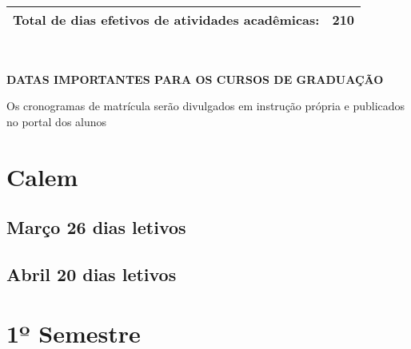 \documentclass[thesis]{hmcposter}
\begin{document}
\begin{poster}
\begin{center}
\begin{table}
{\begin{tabular}{|c|c|c|c|c|c|c|}
\multicolumn{6}{|c|}{\small \textbf{Total de dias efetivos de atividades acadêmicas:}}              & 210            \\ \hline
\end{tabular}
}
\end{table}
\null
\end{center}
\vfill
\null
\columnbreak
~
\vfill
\begin{center}
\large \textbf{DATAS IMPORTANTES PARA OS CURSOS DE GRADUAÇÃO}
\newline
\null
\newline
\begin{table}
\centering
{}
\end{table}
\newline
\null
\newline
Os cronogramas de matrícula serão divulgados em instrução própria e publicados no portal dos alunos
\end{center}
\vfill
\null
\newpage\section{\color{hmcorange}Calem}\subsection{Março \hfill 26 dias letivos}\subsection{Abril \hfill 20 dias letivos}\vfill\null
\columnbreak
\section{\hfill \color{hmcorange}1º Semestre}

\end{poster}
\end{document}
